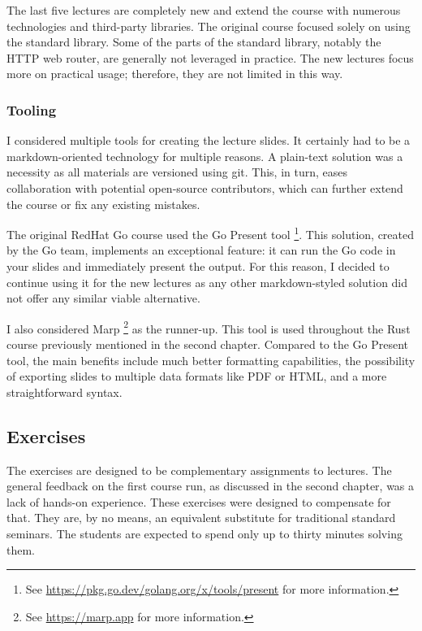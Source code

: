 \documentclass[
  digital,
  color,
  oneside,
  nosansbold,
  nocolorbold,
  lof,
  lot,
]{fithesis4}
\begin{document}
The last five lectures are completely new and extend the course with numerous technologies and third-party libraries. The original course focused solely on using the standard library. Some of the parts of the standard library, notably the HTTP web router, are generally not leveraged in practice. The new lectures focus more on practical usage; therefore, they are not limited in this way.

\subsubsection{Tooling}

I considered multiple tools for creating the lecture slides. It certainly had to be a markdown-oriented technology for multiple reasons. A plain-text solution was a necessity as all materials are versioned using git. This, in turn, eases collaboration with potential open-source contributors, which can further extend the course or fix any existing mistakes.

The original RedHat Go course used the Go Present tool
\footnote{See \url{https://pkg.go.dev/golang.org/x/tools/present} for more information.}.
This solution, created by the Go team, implements an exceptional feature: it can run the Go code in your slides and immediately present the output. For this reason, I decided to continue using it for the new lectures as any other markdown-styled solution did not offer any similar viable alternative.

I also considered Marp
\footnote{See \url{https://marp.app} for more information.}
as the runner-up. This tool is used throughout the Rust course previously mentioned in the second chapter. Compared to the Go Present tool, the main benefits include much better formatting capabilities, the possibility of exporting slides to multiple data formats like PDF or HTML, and a more straightforward syntax.

\subsection{Exercises}

The exercises are designed to be complementary assignments to lectures. The general feedback on the first course run, as discussed in the second chapter, was a lack of hands-on experience. These exercises were designed to compensate for that. They are, by no means, an equivalent substitute for traditional standard seminars. The students are expected to spend only up to thirty minutes solving them.
\end{document}
